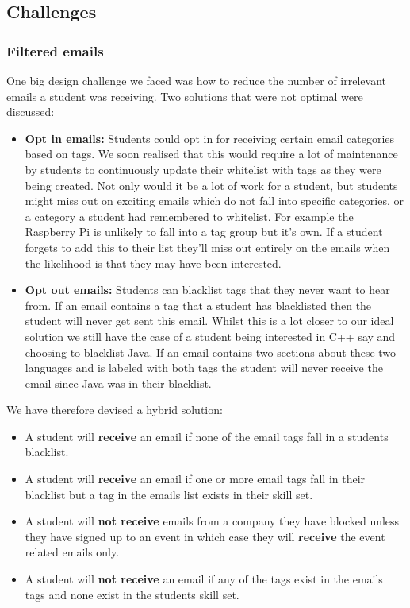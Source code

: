 \subsection{Challenges}
  \subsubsection{Filtered emails}
    One big design challenge we faced was how to reduce the number of irrelevant emails a student was receiving. Two solutions that were not optimal were discussed:
    \begin{itemize}
      \item \textbf{Opt in emails:} Students could opt in for receiving certain email categories based on tags. We soon realised that this would require a lot of maintenance by students to continuously update their whitelist with tags as they were being created.
      Not only would it be a lot of work for a student, but students might miss out on exciting emails which do not fall into specific categories, or a category a student had remembered to whitelist. For example the Raspberry Pi is unlikely to fall into a tag group but it's own. If a student forgets to add this to their list they'll miss out entirely on the emails when the likelihood is that they may have been interested.
      \item \textbf{Opt out emails:} Students can blacklist tags that they never want to hear from. If an email contains a tag that a student has blacklisted then the student will never get sent this email. Whilst this is a lot closer to our ideal solution we still have the case of a student being interested in C++ say and choosing to blacklist Java. If an email contains two sections about these two languages and is labeled with both tags the student will never receive the email since Java was in their blacklist.
    \end{itemize}

    We have therefore devised a hybrid solution:
    \begin{itemize}
      \item A student will \textbf{receive} an email if none of the email tags fall in a students blacklist.
      \item A student will \textbf{receive} an email if one or more email tags fall in their blacklist but a tag in the emails list exists in their skill set.
      \item A student will \textbf{not receive} emails from a company they have blocked unless they have signed up to an event in which case they will \textbf{receive} the event related emails only.
      \item A student will \textbf{not receive} an email if any of the tags exist in the emails tags and none exist in the students skill set.
    \end{itemize}

